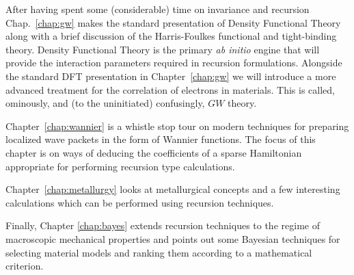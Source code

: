 After having spent some (considerable) time on invariance and recursion
Chap.~\ref{chap:gw} makes the standard presentation of Density Functional Theory along 
with a brief discussion of the Harris-Foulkes functional and tight-binding theory. 
Density Functional Theory is the primary {\it ab initio} engine that will 
provide the interaction parameters required in recursion formulations.
Alongside the standard DFT presentation in Chapter~\ref{chap:gw} we will
introduce a more advanced treatment for the correlation of electrons in materials.
This is called, ominously, and (to the uninitiated) confusingly, $GW$ theory.

Chapter~\ref{chap:wannier} is a whistle stop tour 
on modern techniques for preparing localized wave packets in the 
form of Wannier functions. The focus of this chapter is on 
ways of deducing the coefficients of a sparse Hamiltonian
appropriate for performing recursion type calculations.




Chapter~\ref{chap:metallurgy} looks at metallurgical concepts 
and a few interesting calculations which can be performed 
using recursion techniques. 

Finally, Chapter \ref{chap:bayes} extends recursion techniques
to the regime of macroscopic mechanical properties 
and points out some Bayesian techniques 
for selecting material models and ranking them according 
to a mathematical criterion. 

